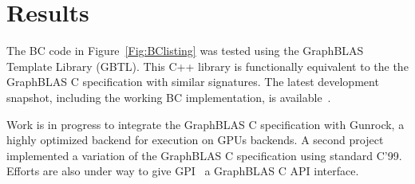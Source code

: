 \section{Results}
\label{sec:results}

The BC code in Figure~\ref{Fig:BClisting} 
was tested using the GraphBLAS Template Library (GBTL)\cite{gbtl-cuda16}. This 
C++ library is functionally equivalent to the the GraphBLAS C
specification with similar signatures.  The latest development snapshot, 
including the working BC implementation, is available~\cite{gbtl-github}. 

Work is in progress to integrate the GraphBLAS C specification 
with Gunrock\cite{topc17}, a highly optimized backend for execution 
on GPUs backends.  A second project~\cite{cook} implemented a variation
of the  GraphBLAS C specification using standard C'99.
Efforts are also under way
to give GPI~\cite{gpi2016} a GraphBLAS C API interface.

